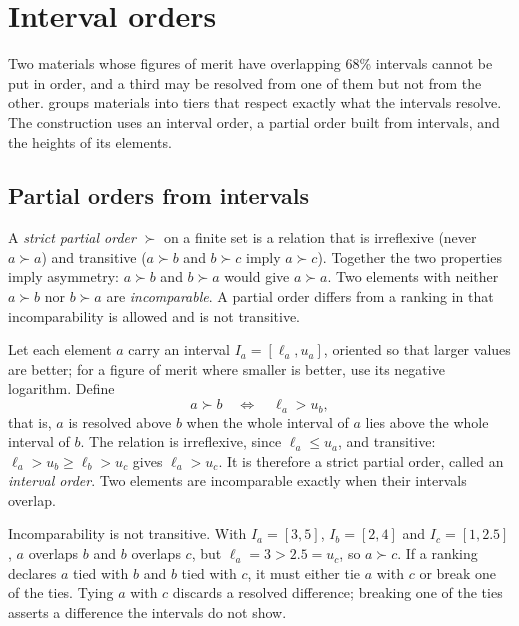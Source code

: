 \section{Interval orders}\label{app:C.13}

Two materials whose figures of merit have overlapping 68\% intervals cannot be put in order, and a third may be resolved from one of them but not from the other.  groups materials into tiers that respect exactly what the intervals resolve. The construction uses an interval order, a partial order built from intervals, and the heights of its elements.

\subsection{Partial orders from intervals}

A \emph{strict partial order} $\succ$ on a finite set is a relation that is irreflexive (never $a \succ a$) and transitive ($a \succ b$ and $b \succ c$ imply $a \succ c$). Together the two properties imply asymmetry: $a \succ b$ and $b \succ a$ would give $a \succ a$. Two elements with neither $a \succ b$ nor $b \succ a$ are \emph{incomparable}. A partial order differs from a ranking in that incomparability is allowed and is not transitive.

Let each element $a$ carry an interval $I_a = [\ell_a, u_a]$, oriented so that larger values are better; for a figure of merit where smaller is better, use its negative logarithm. Define
\begin{equation}
  a \succ b \quad\Longleftrightarrow\quad \ell_a > u_b ,
  \label{eq:C.13-order}
\end{equation}
that is, $a$ is resolved above $b$ when the whole interval of $a$ lies above the whole interval of $b$. The relation is irreflexive, since $\ell_a \le u_a$, and transitive: $\ell_a > u_b \ge \ell_b > u_c$ gives $\ell_a > u_c$. It is therefore a strict partial order, called an \emph{interval order}. Two elements are incomparable exactly when their intervals overlap.

Incomparability is not transitive. With $I_a = [3, 5]$, $I_b = [2, 4]$ and $I_c = [1, 2.5]$, $a$ overlaps $b$ and $b$ overlaps $c$, but $\ell_a = 3 > 2.5 = u_c$, so $a \succ c$. If a ranking declares $a$ tied with $b$ and $b$ tied with $c$, it must either tie $a$ with $c$ or break one of the ties. Tying $a$ with $c$ discards a resolved difference; breaking one of the ties asserts a difference the intervals do not show.


